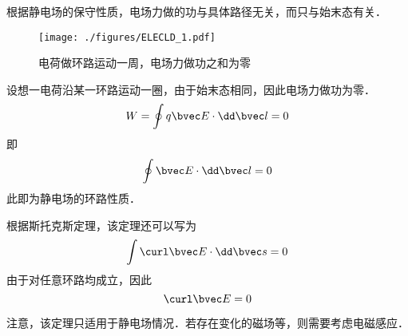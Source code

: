 

根据静电场的保守性质，电场力做的功与具体路径无关，而只与始末态有关．
\begin{figure}[ht]
\centering
\texttt{[image: ./figures/ELECLD\_1.pdf]}
\caption{电荷做环路运动一周，电场力做功之和为零} \label{ELECLD_fig1}
\end{figure}

设想一电荷沿某一环路运动一圈，由于始末态相同，因此电场力做功为零．
$$
W = \oint q\bvec E \cdot \dd \bvec l = 0
$$
即
\begin{equation}
\oint \bvec E \cdot \dd \bvec l = 0
\end{equation}
此即为静电场的环路性质．

根据斯托克斯定理，该定理还可以写为
$$\int \curl \bvec E \cdot \dd \bvec s = 0$$
由于对任意环路均成立，因此
\begin{equation}
\curl \bvec E = 0
\end{equation}

注意，该定理只适用于静电场情况．若存在变化的磁场等，则需要考虑电磁感应．